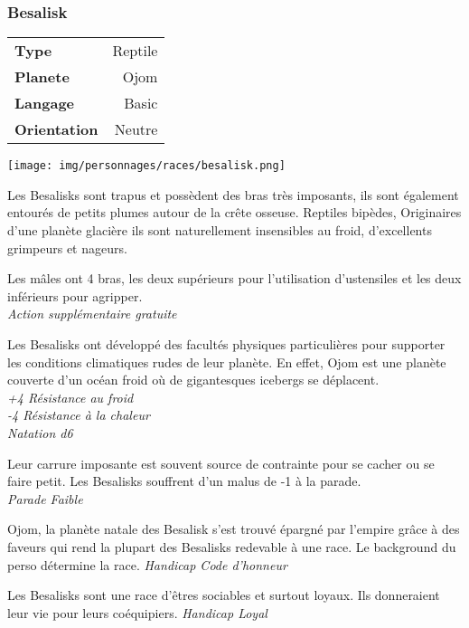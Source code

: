 \subsubsection{Besalisk}
\vspace{-2\baselineskip}
\begin{flushright}	
    \begin{tabular}{|l|r|}
        \textbf{Type} & Reptile \\
        \textbf{Planete} & Ojom \\
        \textbf{Langage} & Basic \\
        \textbf{Orientation} & Neutre\\
    \end{tabular}
\end{flushright}
\vspace{-3\baselineskip}
\texttt{[image: img/personnages/races/besalisk.png]}
 
Les Besalisks sont trapus et possèdent des bras très imposants, ils sont également entourés de petits plumes autour de la crête osseuse. Reptiles bipèdes, Originaires d’une planète glacière ils sont naturellement insensibles au froid, d’excellents grimpeurs et nageurs. 

\begin{description}[align=left]
  \item [A bras le corps]         %
      Les mâles ont 4 bras, les deux supérieurs pour l’utilisation d’ustensiles et les deux inférieurs pour agripper.\\
    \textit{Action supplémentaire gratuite}
  
  \item [Pas frileux]             %
      Les Besalisks ont développé des facultés physiques particulières pour supporter les conditions climatiques rudes de leur planète. En effet, Ojom est une planète couverte d’un océan froid où de gigantesques icebergs se déplacent.\\
   \textit{+4 Résistance au froid}\\
   \textit{-4 Résistance à la chaleur}\\
   \textit{Natation d6}
  
  \item[Imposant :]  %
	Leur carrure imposante est souvent source de contrainte pour se cacher ou se faire petit. Les Besalisks souffrent d'un malus de -1 à la parade.\\
	\textit{Parade Faible}
  
\item [Dette de Liberté]        %
      Ojom, la planète natale des Besalisk s’est trouvé épargné par l’empire grâce à des faveurs qui rend la plupart des Besalisks redevable à une race. Le background du perso détermine la race.
    \textit{Handicap Code d’honneur}
  
  \item [Loyal]                   %
    Les Besalisks sont une race d’êtres sociables et surtout loyaux. Ils donneraient leur vie pour leurs coéquipiers.
   \textit{Handicap Loyal}
  \end{description}
